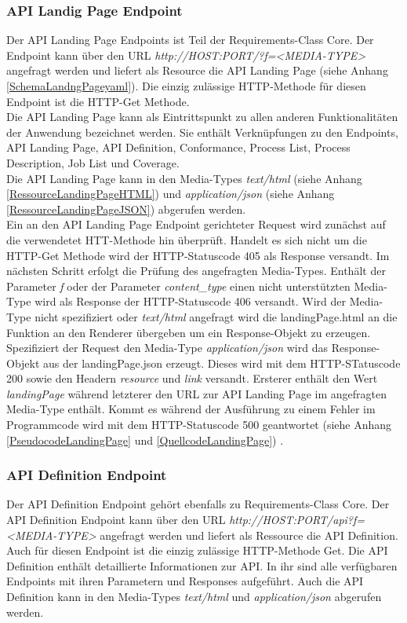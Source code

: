 \subsubsection{API Landig Page Endpoint}
Der API Landing Page Endpoints ist Teil der Requirements-Class Core.
Der Endpoint kann über den URL \textit{http://HOST:PORT/?f=<MEDIA-TYPE>} angefragt werden und liefert als Resource die 
API Landing Page (siehe Anhang \ref{SchemaLandngPageyaml}). 
Die einzig zulässige HTTP-Methode für diesen Endpoint ist die HTTP-Get Methode.\\ 
Die API Landing Page kann als Eintrittspunkt zu allen anderen Funktionalitäten der Anwendung bezeichnet werden. Sie enthält Verknüpfungen zu den Endpoints, 
API Landing Page, API Definition, Conformance, Process List, Process Description, Job List und Coverage.\\
Die API Landing Page kann in den Media-Types \textit{text/html} (siehe Anhang \ref{RessourceLandingPageHTML}) und \textit{application/json} 
(siehe Anhang \ref{RessourceLandingPageJSON}) abgerufen werden. \\

Ein an den API Landing Page Endpoint gerichteter Request wird zunächst auf die verwendetet HTT-Methode hin überprüft. Handelt es sich nicht um die HTTP-Get 
Methode wird der HTTP-Statuscode 405 als Response versandt. Im nächsten Schritt erfolgt die Prüfung des angefragten Media-Types. Enthält der Parameter \textit{f} 
oder der Parameter \textit{content\_type} einen nicht unterstützten Media-Type wird als Response der HTTP-Statuscode 406 versandt. Wird der Media-Type nicht spezifiziert oder
\textit{text/html} angefragt wird die landingPage.html an die Funktion an den Renderer übergeben um ein Response-Objekt zu erzeugen. Spezifiziert der Request 
den Media-Type \textit{application/json} wird das Response-Objekt aus der landingPage.json erzeugt. Dieses wird mit dem HTTP-STatuscode 200 sowie den Headern
\textit{resource} und \textit{link} versandt. Ersterer enthält den Wert \textit{landingPage} während letzterer den URL zur API Landing Page im angefragten Media-Type 
enthält. Kommt es während der Ausführung zu einem Fehler im Programmcode wird mit dem HTTP-Statuscode 500 geantwortet
(siehe Anhang \ref{PseudocodeLandingPage} und \ref{QuellcodeLandingPage}) \cite{ogc_api_processes_core}. 

\subsubsection{API Definition Endpoint}
Der API Definition Endpoint gehört ebenfalls zu Requirements-Class Core.
Der API Definition Endpoint kann über den URL \textit{http://HOST:PORT/api?f=<MEDIA-TYPE>} angefragt werden und liefert als Ressource die API Definition. 
Auch für diesen Endpoint ist die einzig zulässige HTTP-Methode Get. 
Die API Definition enthält detaillierte Informationen zur API. In ihr sind alle verfügbaren Endpoints mit ihren Parametern und Responses aufgeführt. 
Auch die API Definition kann in den Media-Types \textit{text/html} und \textit{application/json} abgerufen werden.\\
   
